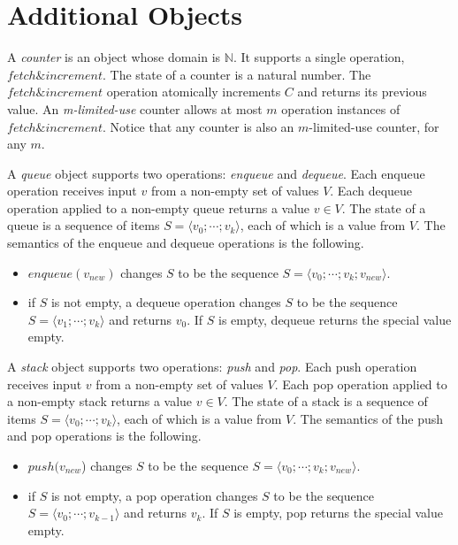 	
	\section{Additional Objects}
	\label{sec:AdditionalObjects}
	
	A \emph{counter} is an object whose domain is $\mathbb{N}$. It supports a single operation, $fetch \& increment$. The state of a counter is a natural number. The $fetch \& increment$ operation atomically increments $C$ and returns its previous value. An \emph{m-limited-use} counter allows at most $m$ operation instances of $fetch \& increment$. Notice that any counter is also an $m$-limited-use counter, for any $m$.

	A \emph{queue} object supports two operations: \emph{enqueue} and \emph{dequeue}. Each enqueue operation receives input $v$ from a non-empty set of values $V$. Each dequeue operation applied to a non-empty queue returns a value $v \in V$. The state of a queue is a sequence of items $S = \langle v_0; \cdots ; v_k \rangle$, each of which is a value from $V$. The semantics of the enqueue and dequeue operations is the following.
	\begin{itemize}
		\item $enqueue(v_{new})$ changes $S$ to be the sequence $S = \langle v_0; \cdots ; v_k ; v_{new} \rangle$.
		\item if $S$ is not empty, a dequeue operation changes $S$ to be the sequence $S = \langle v_1; \cdots ; v_k \rangle$ and returns $v_0$. If $S$ is empty, dequeue returns the special value empty.
	\end{itemize}

	A \emph{stack} object supports two operations: \emph{push} and \emph{pop}. Each push operation receives input $v$ from a non-empty set of values $V$. Each pop operation applied to a non-empty stack returns a value $v \in V$. The state of a stack is a sequence of items $S = \langle v_0; \cdots ; v_k \rangle$, each of which is a value from $V$. The semantics of the push and pop operations is the following.
	\begin{itemize}
		\item $push(v_{new}$) changes $S$ to be the sequence $S = \langle v_0; \cdots ; v_k ; v_{new} \rangle$.
		\item if $S$ is not empty, a pop operation changes $S$ to be the sequence $S = \langle v_0; \cdots ; v_{k-1} \rangle$ and returns $v_k$. If $S$ is empty, pop returns the special value empty.
	\end{itemize}
	
